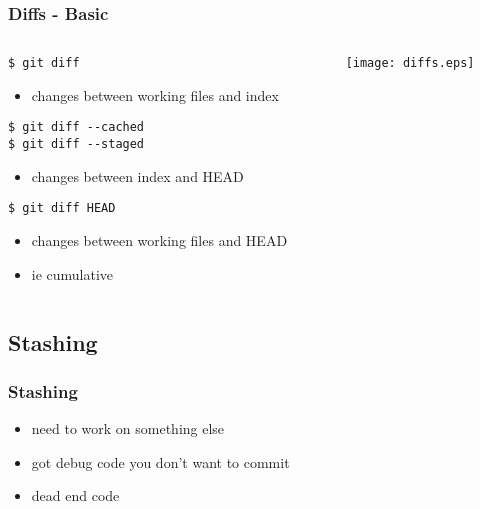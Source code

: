 \documentclass[english]{beamer}
\newcommand{\mysubsection}[2]{%
  \hypertarget{#2}{}%
  \subsection{#1}%
  \label{#2}%
}
\newcommand{\CMD}[1]{%
\texttt{\textcolor{code-blue}{#1}}%
}
\begin{document}
\begin{frame}
\frametitle{Diffs - Basic}

\begin{columns}[t]
        \begin{column}[T]{.5\textwidth}
            \CMD{\$ git diff}
            \begin{itemize}
                    \item changes between working files and index
            \end{itemize}

            \vspace{.1\textheight}

            \CMD{\$ git diff {-}-cached} \\
            \CMD{\$ git diff {-}-staged}
            \begin{itemize}
                    \item changes between index and HEAD
            \end{itemize}

            \vspace{.1\textheight}

            \CMD{\$ git diff HEAD}
            \begin{itemize}
                    \item changes between working files and HEAD \\
                    \item ie cumulative
            \end{itemize}
        \end{column}
        \begin{column}[T]{.5\textwidth}
                \texttt{[image: diffs.eps]}
        \end{column}
\end{columns}



\end{frame}

\mysubsection{Stashing}{using:stashing}
\begin{frame}
\frametitle{Stashing}
\begin{itemize}
        \item need to work on something else
                \vspace{\baselineskip}
        \item got debug code you don't want to commit
                \vspace{\baselineskip}
        \item dead end code
\end{itemize}
\end{frame}
\end{document}
